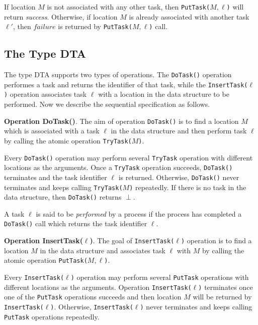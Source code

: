 If location $M$ is not associated with any other task, then \texttt{PutTask(}$M,\ell$\texttt{)} will return \emph{success}.
Otherwise, if location $M$ is already associated with another task $\ell'$, then $failure$ is returned
by \texttt{PutTask(}$M,\ell$\texttt{)} call.

\subsection{The Type DTA}

The type DTA supports two types of operations. The \texttt{DoTask()} operation performes a task
and returns the identifier of that task, while the \texttt{InsertTask(}$\ell$\texttt{)} operation associates task
$\ell$ with a location in the data structure to be performed. Now we describe the sequential specification
as follows.

\textbf{Operation DoTask()}.
The aim of operation \texttt{DoTask()} is to find a location $M$ which is associated with a task
$\ell$ in the data structure and then perform task $\ell$ by calling the atomic operation \texttt{TryTask(}$M$\texttt{)}.

Every \texttt{DoTask()} operation may perform several \texttt{TryTask} operation with different locations as the
arguments. Once a \texttt{TryTask} operation succeeds, \texttt{DoTask()} terminates and
the task identifier $\ell$ is returned. Otherwise, \texttt{DoTask()} never terminates and keeps calling
\texttt{TryTask(}$M$\texttt{)} repeatedly. If there is no task in the data structure,
then \texttt{DoTask()} returns $\perp$.

A task $\ell$ is said to be \emph{performed} by a process if the process has completed a \texttt{DoTask()} call
which returns the task identifier $\ell$.

\textbf{Operation InsertTask($\ell$)}.
The goal of \texttt{InsertTask(}$\ell$\texttt{)} operation is to find a location $M$ in the data structure and
associates task $\ell$ with $M$ by calling the atomic operation \texttt{PutTask(}$M,\ell$\texttt{)}.

Every \texttt{InsertTask(}$\ell$\texttt{)} operation may perform several \texttt{PutTask} operations with
different locations as the arguments. Operation \texttt{InsertTask(}$\ell$\texttt{)} terminates once one of the
\texttt{PutTask} operations succeeds and then location $M$ will be returned by \texttt{InsertTask(}$\ell$\texttt{)}.
Otherwise, \texttt{InsertTask(}$\ell$\texttt{)} never terminates and keeps
calling \texttt{PutTask} operations repeatedly.

